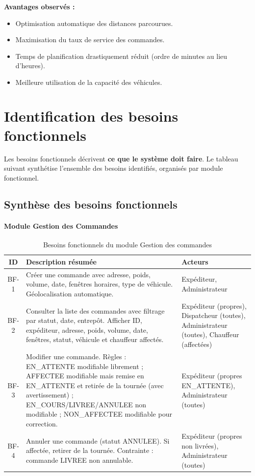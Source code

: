 \documentclass[12pt,a4paper]{report}
\begin{document}
\textbf{Avantages observés :}

\begin{itemize}[leftmargin=2.2em]
    \item Optimisation automatique des distances parcourues.
    \item Maximisation du taux de service des commandes.
    \item Temps de planification drastiquement réduit (ordre de minutes au lieu d'heures).
    \item Meilleure utilisation de la capacité des véhicules.
\end{itemize}


\section{Identification des besoins fonctionnels}

Les besoins fonctionnels décrivent \textbf{ce que le système doit faire}. Le tableau suivant synthétise l'ensemble des besoins identifiés, organisés par module fonctionnel.

\subsection{Synthèse des besoins fonctionnels}

\paragraph{Module Gestion des Commandes}

\begin{table}[H]
\centering
\footnotesize
\begin{tabular}{|c|p{7.5cm}|p{4cm}|}
\hline
\textbf{ID} & \textbf{Description résumée} & \textbf{Acteurs} \\
\hline
BF-1 & Créer une commande avec adresse, poids, volume, date, fenêtres horaires, type de véhicule. Géolocalisation automatique. & Expéditeur, Administrateur \\
\hline
BF-2 & Consulter la liste des commandes avec filtrage par statut, date, entrepôt. Afficher ID, expéditeur, adresse, poids, volume, date, fenêtres, statut, véhicule et chauffeur affectés. & Expéditeur (propres), Dispatcheur (toutes), Administrateur (toutes), Chauffeur (affectées) \\
\hline
BF-3 & Modifier une commande. Règles : EN\_ATTENTE modifiable librement ; AFFECTEE modifiable mais remise en EN\_ATTENTE et retirée de la tournée (avec avertissement) ; EN\_COURS/LIVREE/ANNULEE non modifiable ; NON\_AFFECTEE modifiable pour correction. & Expéditeur (propres EN\_ATTENTE), Administrateur (toutes) \\
\hline
BF-4 & Annuler une commande (statut ANNULEE). Si affectée, retirer de la tournée. Contrainte : commande LIVREE non annulable. & Expéditeur (propres non livrées), Administrateur (toutes) \\
\hline
\end{tabular}
\caption{Besoins fonctionnels du module Gestion des commandes}
\label{tab:bf-commandes}
\end{table}
\end{document}
